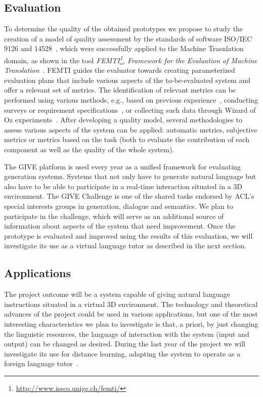 \subsection{Evaluation}
To determine the quality of the obtained prototypes we propose to study the
creation of a model of quality assessment by the standards of software ISO/IEC
9126 and 14528~\cite{ISO9126-1,ISO14598-1}, which were successfully applied to
the Machine Trasnlation domain, as shown in the tool \emph{FEMTI\footnote{\url{http://www.issco.unige.ch/femti/}}, Framework for the Evaluation of
Machine Translation}~\cite{Est2005}. FEMTI
guides the evaluator towards creating parameterized evaluation
plans that include various aspects of the to-be-evaluated system and offer a
relevant set of metrics. The identification of relevant metrics can be performed
using various methods, e.g., based on previous
experience~\cite{paradise06,Chu2000}, conducting
surveys or requirement specifications~\cite{Lecoeuche98}, or
collecting such data through Wizard of Oz experiments~\cite{Dahlback93}.
After developing a quality model, several methodologies to assess
various aspects of the system can be applied: automatic metrics,
subjective metrics or metrics based on the task (both to
evaluate the contribution of each component as well as the quality of the whole
system). 

The GIVE platform is used every year as a unified framework for evaluating
generation systems. Systems that not only have to generate natural language
but also have to be able to participate in a real-time interaction situated in a
3D environment. The GIVE Challenge is one of the shared tasks endorsed by
ACL's special interests groups in generation, dialogue and semantics. We plan
to participate in the challenge, which will serve as an additional
source of information about aspects of the system that need
improvement.
Once the prototype is evaluated and improved using the results
of this evaluation, we will investigate its use as a virtual language tutor as
described in the next section.

\subsection{Applications}

The project outcome will be a system capable of giving natural language
instructions situated in a virtual 3D environment. The technology and
theoretical advances of the project could be used in various applications, but
one of the most interesting characteristics we plan to investigate is that, 
a priori, by just changing the linguistic resources, the language of interaction
with the system (input and output) can be changed as desired. During
the last year of the project we will investigate its use for distance learning,
adapting the system to operate as a foreign language tutor~\cite{Wik09}.


